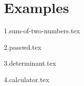 
\chapter{Examples}
{
	\lipsum[1]
	
	{1.sum-of-two-numbers.tex}
	
	{2.passwd.tex}
	
	{3.determinant.tex}
	
	{4.calculator.tex}
}

